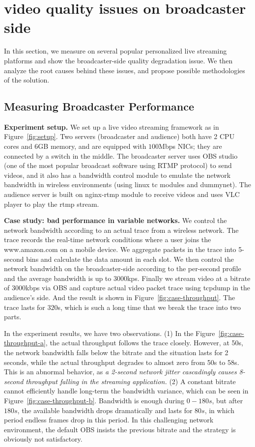 \section{video quality issues on broadcaster side}

In this section, we measure on several popular personalized live streaming platforms and show the broadcaster-side quality degradation issue. We then analyze the root causes behind these issues, and propose possible methodologies of the solution.

\subsection{Measuring Broadcaster Performance}

\textbf{Experiment setup.} We set up a live video streaming framework as in Figure~\ref{fig:setup}. Two servers (broadcaster and audience) both have 2 CPU cores and 6GB memory, and are equipped with $100$Mbps NICs; they are connected by a switch in the middle.
The broadcaster server uses OBS studio\cite{OBS} (one of the most popular broadcast software using RTMP protocol) to send videos, and it also has a bandwidth control module to emulate the network bandwidth in wireless environments (using linux tc modules and dummynet\cite{dummynet}). The audience server is built on nginx-rtmp module to receive videos and uses VLC player to play the rtmp stream.


\textbf{Case study: bad performance in variable networks.} We control the network bandwidth according to an actual trace from a wireless network. The trace records the real-time network conditions where a user joins the www.amazon.com on a mobile device. We aggregate packets in the trace into 5-second bins and calculate the data amount in each slot. We then control the network bandwidth on the broadcaster-side according to the per-second profile and the average bandwidth is up to $3000$kps. Finally we stream video at a bitrate of $3000$kbps via OBS and capture actual video packet trace using tcpdump in the audience's side. And the result is shown in Figure~\ref{fig:case-throughput}.  The trace lasts for $320$s, which is such a long time that we break the trace into two parts.

In the experiment results, we have two observations. (1) In the Figure~\ref{fig:case-throughput-a}, the actual throughput follows the trace closely. However, at 50s, the network bandwidth falls below the bitrate and the situation lasts for 2 seconds, while the actual throughput degrades to almost zero from 50s to 58s. This is an abnormal behavior, as \textit{a 2-second network jitter cascadingly causes 8-second throughput falling in the streaming application.} (2) A constant bitrate cannot efficiently handle long-term the bandwidth variance, which can be seen in Figure~\ref{fig:case-throughput-b}. Bandwidth is enough during $0-180s$, but after $180s$, the available bandwidth drops dramatically and lasts for $80s$, in which period endless frames drop in this period. In this challenging network environment, the default OBS insists the previous bitrate and the strategy is obviously not satisfactory.

